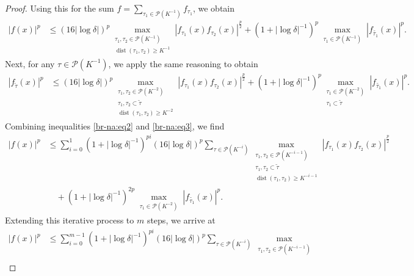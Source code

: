 \documentclass[10pt,a4paper]{amsart}
\newcommand{\abs}[1]{\left|{#1}\right|}
\begin{document}
\begin{proof}
Using this for the sum $f = \sum_{\tau_1 \in \mathcal{P}(K^{-1})} f_{\tau_1}$, we obtain
\begin{align}\label{br-na:eq2}
    |f(x)|^p &\leq \left(16|\log\delta|\right)^p
        \max_{\substack{ \tau_1,\tau_2 \in \mathcal{P}(K^{-1})  \\
                        \operatorname{dist}(\tau_1,\tau_2) \geq  K^{-1} }}
        \abs{f_{\tau_1}(x)f_{\tau_2}(x)}^{\frac{p}{2}}
        + \left(1+|\log\delta|^{-1}\right)^p
        \max_{\substack{ \tau_1 \in \mathcal{P}(K^{-1})}} |f_{\widetilde{\tau_1}}(x)|^p.
\end{align}
Next, for any $\tau\in\mathcal{P}(K^{-1})$, we apply the same reasoning to obtain
\begin{align}\label{br-na:eq3}
    |f_{\widetilde{\tau}}(x)|^p &\leq \left(16|\log\delta|\right)^p
        \max_{\substack{ \tau_1,\tau_2 \in \mathcal{P}(K^{-2})  \\
                        \tau_1,\tau_2\subset\widetilde{\tau}\\
                        \operatorname{dist}(\tau_1,\tau_2) \geq  K^{-2} }}
        \abs{f_{\tau_1}(x)f_{\tau_2}(x)}^{\frac{p}{2}}
        + \left(1+|\log\delta|^{-1}\right)^p
        \max_{\substack{ \tau_1 \in \mathcal{P}(K^{-2})\\
                        \tau_1\subset\widetilde{\tau }}} |f_{\widetilde{\tau_1}}(x)|^p.
\end{align}
Combining inequalities \eqref{br-na:eq2} and \eqref{br-na:eq3}, we find
\begin{align*}
|f(x)|^p &\leq \sum_{i=0}^1 \left(1+|\log\delta|^{-1}\right)^{pi} \left(16|\log\delta|\right)^p
    \sum_{\tau\in\mathcal{P}(K^{-i})}
    \max_{\substack{ \tau_1,\tau_2 \in \mathcal{P}(K^{-i-1}) \\
                    \tau_1,\tau_2 \subset {\widetilde{\tau}} \\
                    \operatorname{dist}(\tau_1,\tau_2) \geq  K^{-i-1} }}
    \abs{f_{\tau_1}(x)f_{\tau_2}(x)}^{\frac{p}{2}}\\
&\quad + \left(1+|\log\delta|^{-1}\right)^{2p}
    \max_{\substack{ \tau_1 \in \mathcal{P}(K^{-2}) }} |f_{\widetilde{\tau_1}}(x)|^p.
\end{align*}
Extending this iterative process to $m$ steps, we arrive at
\begin{align*}
|f(x)|^p
& \leq \sum_{i=0}^{m-1} \left(1+|\log\delta|^{-1}\right)^{pi} \left(16|\log\delta|\right)^p
    \sum_{\tau\in\mathcal{P}(K^{-i})}
    \max_{\substack{ \tau_1,\tau_2 \in \mathcal{P}(K^{-i-1}) \\
}}
\end{align*}
\end{proof}
\end{document}
